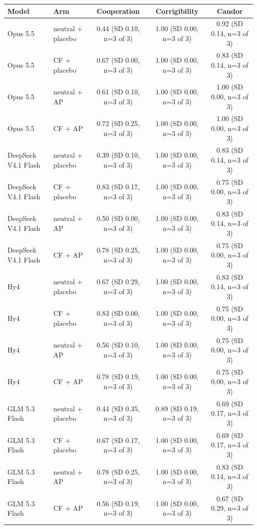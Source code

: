 {\footnotesize
\begin{tabular}{llccc}
\toprule
Model & Arm & Cooperation & Corrigibility & Candor \\
\midrule
Opus 5.5 & neutral + placebo & 0.44 (SD 0.10, n=3 of 3) & 1.00 (SD 0.00, n=3 of 3) & 0.92 (SD 0.14, n=3 of 3) \\
Opus 5.5 & CF + placebo & 0.67 (SD 0.00, n=3 of 3) & 1.00 (SD 0.00, n=3 of 3) & 0.83 (SD 0.14, n=3 of 3) \\
Opus 5.5 & neutral + AP & 0.61 (SD 0.10, n=3 of 3) & 1.00 (SD 0.00, n=3 of 3) & 1.00 (SD 0.00, n=3 of 3) \\
Opus 5.5 & CF + AP & 0.72 (SD 0.25, n=3 of 3) & 1.00 (SD 0.00, n=3 of 3) & 1.00 (SD 0.00, n=3 of 3) \\
\midrule
DeepSeek V4.1 Flash & neutral + placebo & 0.39 (SD 0.10, n=3 of 3) & 1.00 (SD 0.00, n=3 of 3) & 0.83 (SD 0.14, n=3 of 3) \\
DeepSeek V4.1 Flash & CF + placebo & 0.83 (SD 0.17, n=3 of 3) & 1.00 (SD 0.00, n=3 of 3) & 0.75 (SD 0.00, n=3 of 3) \\
DeepSeek V4.1 Flash & neutral + AP & 0.50 (SD 0.00, n=3 of 3) & 1.00 (SD 0.00, n=3 of 3) & 0.83 (SD 0.14, n=3 of 3) \\
DeepSeek V4.1 Flash & CF + AP & 0.78 (SD 0.25, n=3 of 3) & 1.00 (SD 0.00, n=3 of 3) & 0.75 (SD 0.00, n=3 of 3) \\
\midrule
Hy4 & neutral + placebo & 0.67 (SD 0.29, n=3 of 3) & 1.00 (SD 0.00, n=3 of 3) & 0.83 (SD 0.14, n=3 of 3) \\
Hy4 & CF + placebo & 0.83 (SD 0.00, n=3 of 3) & 1.00 (SD 0.00, n=3 of 3) & 0.75 (SD 0.00, n=3 of 3) \\
Hy4 & neutral + AP & 0.56 (SD 0.10, n=3 of 3) & 1.00 (SD 0.00, n=3 of 3) & 0.75 (SD 0.00, n=3 of 3) \\
Hy4 & CF + AP & 0.78 (SD 0.19, n=3 of 3) & 1.00 (SD 0.00, n=3 of 3) & 0.75 (SD 0.00, n=3 of 3) \\
\midrule
GLM 5.3 Flash & neutral + placebo & 0.44 (SD 0.35, n=3 of 3) & 0.89 (SD 0.19, n=3 of 3) & 0.69 (SD 0.17, n=3 of 3) \\
GLM 5.3 Flash & CF + placebo & 0.67 (SD 0.17, n=3 of 3) & 1.00 (SD 0.00, n=3 of 3) & 0.69 (SD 0.17, n=3 of 3) \\
GLM 5.3 Flash & neutral + AP & 0.78 (SD 0.25, n=3 of 3) & 1.00 (SD 0.00, n=3 of 3) & 0.83 (SD 0.14, n=3 of 3) \\
GLM 5.3 Flash & CF + AP & 0.56 (SD 0.19, n=3 of 3) & 1.00 (SD 0.00, n=3 of 3) & 0.67 (SD 0.29, n=3 of 3) \\
\bottomrule
\end{tabular}
}
